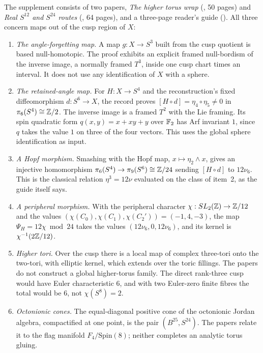 The supplement consists of two papers, \emph{The higher torus wrap} (, 50 pages) and \emph{Real $S^{12}$ and $S^{24}$ routes} (, 64 pages), and a three-page reader's guide (). All three concern maps out of the cusp region of $X$:
\begin{enumerate}[label=\arabic*.]
\item \emph{The angle-forgetting map.} A map $g:X\to S^3$ built from the cusp quotient is based null-homotopic. The proof exhibits an explicit framed null-bordism of the inverse image, a normally framed $T^3$, inside one cusp chart times an interval. It does not use any identification of $X$ with a sphere.
\item \emph{The retained-angle map.} For $H:X\to S^4$ and the reconstruction's fixed diffeomorphism $d:S^6\to X$, the record proves $[H\circ d]=\eta_4\circ\eta_5\neq0$ in $\pi_6(S^4)\cong\mathbb{Z}/2$. The inverse image is a framed $T^2$ with the Lie framing. Its spin quadratic form $q(x,y)=x+xy+y$ over $\mathbb{F}_2$ has Arf invariant $1$, since $q$ takes the value $1$ on three of the four vectors. This uses the global sphere identification as input.
\item \emph{A Hopf morphism.} Smashing with the Hopf map, $x\mapsto\eta_2\wedge x$, gives an injective homomorphism $\pi_6(S^4)\to\pi_9(S^6)\cong\mathbb{Z}/24$ sending $[H\circ d]$ to $12\nu_6$. This is the classical relation $\eta^3=12\nu$ \cite{Toda62} evaluated on the class of item~2, as the guide itself says.
\item \emph{A peripheral morphism.} With the peripheral character $\chi:SL_2(\mathbb{Z})\to\mathbb{Z}/12$ and the values $(\chi(C_0),\chi(C_1),\chi(C_2'))=(-1,4,-3)$, the map $\Psi_H=12\chi\bmod24$ takes the values $(12\nu_6,0,12\nu_6)$, and its kernel is $\chi^{-1}(2\mathbb{Z}/12)$.
\item \emph{Higher tori.} Over the cusp there is a local map of complex three-tori onto the two-tori, with elliptic kernel, which extends over the toric fillings. The papers do not construct a global higher-torus family. The direct rank-three cusp would have Euler characteristic $6$, and with two Euler-zero finite fibres the total would be $6$, not $\chi(S^8)=2$.
\item \emph{Octonionic cones.} The equal-diagonal positive cone of the octonionic Jordan algebra, compactified at one point, is the pair $(B^{25},S^{24})$. The papers relate it to the flag manifold $F_4/\mathrm{Spin}(8)$; neither completes an analytic torus gluing.
\end{enumerate}

